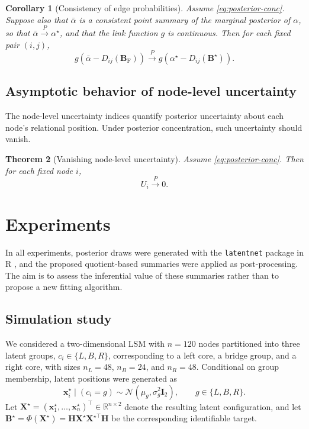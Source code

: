 \documentclass[12pt]{article}
\newcommand{\bbR}{\mathbb{R}}
\newcommand{\bfB}{\boldsymbol{B}}
\newcommand{\bfH}{\boldsymbol{H}}
\newcommand{\bfI}{\boldsymbol{I}}
\newcommand{\bfX}{\boldsymbol{X}}
\newcommand{\bfx}{\boldsymbol{x}}
\newcommand{\BF}{\bfB_{\mathrm{F}}}
\newtheorem{theorem}{Theorem}
\newtheorem{corollary}[theorem]{Corollary}
\begin{document}
\begin{corollary}[Consistency of edge probabilities]\label{cor:prob-cons}
Assume \eqref{eq:posterior-conc}. Suppose also that $\bar{\alpha}$ is a consistent point summary of
the marginal posterior of $\alpha$, so that $\bar{\alpha}\xrightarrow{P}\alpha^\star$, and that the
link function $g$ is continuous. Then for each fixed pair $(i,j)$,
\[
g\!\left(\bar{\alpha}-D_{ij}(\BF)\right)
\xrightarrow{P}
g\!\left(\alpha^\star-D_{ij}(\bfB^\star)\right).
\]
\end{corollary}

\subsection{Asymptotic behavior of node-level uncertainty}\label{subsec:node-asymp}

The node-level uncertainty indices quantify posterior uncertainty about each node's relational
position. Under posterior concentration, such uncertainty should vanish.

\begin{theorem}[Vanishing node-level uncertainty]\label{thm:node-vanish}
Assume \eqref{eq:posterior-conc}. Then for each fixed node $i$,
\[
U_i\xrightarrow{P}0.
\]
\end{theorem}

\section{Experiments}\label{sec:experiments}


In all experiments, posterior draws were generated with the \texttt{latentnet} package
\citep{krivitsky_2008_FittingPositionLatent} in \textsf{R}
\citep{rcoreteam_2025_LanguageEnvironmentStatistical}, and the proposed quotient-based summaries were applied as post-processing. The aim is to assess the inferential value of these summaries rather than to propose a new fitting algorithm.

\subsection{Simulation study}\label{subsec:sim}

We considered a two-dimensional LSM with $n=120$ nodes partitioned into three latent groups,
$c_i\in\{L,B,R\}$, corresponding to a left core, a bridge group, and a right core, with sizes
$n_L=48$, $n_B=24$, and $n_R=48$. Conditional on group membership, latent positions were generated as
\[
\bfx_i^\star \mid (c_i=g)\sim \mathcal N(\mu_g,\sigma_g^2\bfI_2),
\qquad g\in\{L,B,R\}.
\]
Let $\bfX^\star=(\bfx_1^\star,\ldots,\bfx_n^\star)^\top\in\bbR^{n\times 2} $
denote the resulting latent configuration, and let $\bfB^\star=\Phi(\bfX^\star)=\bfH\bfX^\star\bfX^{\star\top}\bfH$ be the corresponding identifiable target.
\end{document}

